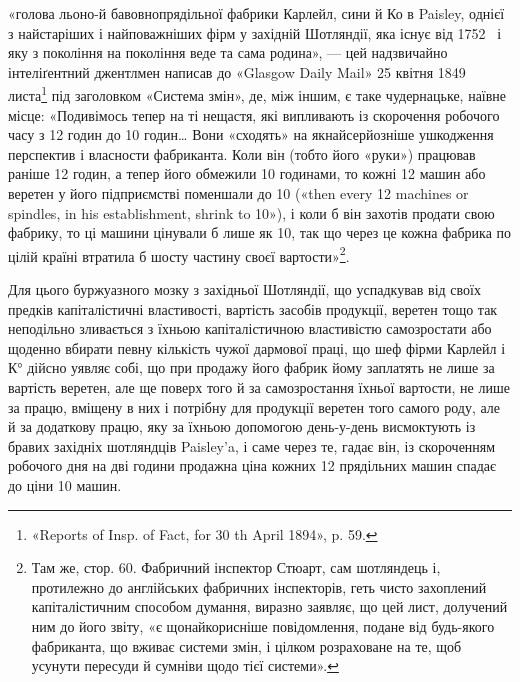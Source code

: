 \parcont{}  %
«голова льоно-й бавовнопрядільної фабрики Карлейл, сини й
Ко в Paisley, однієї з найстаріших і найповажніших фірм у західній
Шотляндії, яка існує від 1752~ і яку з покоління на покоління
веде та сама родина», — цей надзвичайно інтеліґентний
джентлмен написав до «Glasgow Daily Mail» 25 квітня 1849~
листа\footnote{
«Reports of Insp. of Fact, for 30 th April 1894», p. 59.
} під заголовком «Система змін», де, між іншим, є таке
чудернацьке, наївне місце: «Подивімось тепер на ті нещастя,
які випливають із скорочення робочого часу з 12 годин до 10 годин\dots{}
Вони «сходять» на якнайсерйозніше ушкодження перспектив
і власности фабриканта. Коли він (тобто його «руки») працював
раніше 12 годин, а тепер його обмежили 10 годинами, то кожні
12 машин або веретен у його підприємстві поменшали до 10 («then
every 12 machines or spindles, in his establishment, shrink to 10»),
і коли б він захотів продати свою фабрику, то ці машини цінували
б лише як 10, так що через це кожна фабрика по цілій країні
втратила б шосту частину своєї вартости»\footnote{
Там же, стор. 60. Фабричний інспектор Стюарт, сам шотляндець і,
протилежно до англійських фабричних інспекторів, геть чисто захоплений
капіталістичним способом думання, виразно заявляє, що цей лист,
долучений ним до його звіту, «є щонайкорисніше повідомлення, подане від
будь-якого фабриканта, що вживає системи змін, і цілком розраховане
на те, щоб усунути пересуди й сумніви щодо тієї системи».
}.

Для цього буржуазного мозку з західньої Шотляндії, що
успадкував від своїх предків капіталістичні властивості, вартість
засобів продукції, веретен тощо так неподільно зливається з
їхньою капіталістичною властивістю самозростати або щоденно вбирати
певну кількість чужої дармової праці, що шеф фірми Карлейл
і К° дійсно уявляє собі, що при продажу його фабрик йому
заплатять не лише за вартість веретен, але ще поверх того й за
самозростання їхньої вартости, не лише за працю, вміщену в них
і потрібну для продукції веретен того самого роду, але й за додаткову
працю, яку за їхньою допомогою день-у-день висмоктують
із бравих західніх шотляндців Paisley’a, і саме через те,
гадає він, із скороченням робочого дня на дві години продажна
ціна кожних 12 прядільних машин спадає до ціни 10 машин.
